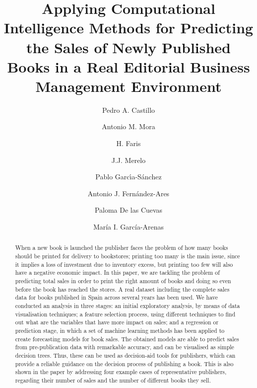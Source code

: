 \documentclass[a4paper,10pt,twocolumn,preprint,3p]{elsarticle}
\begin{document}
\begin{frontmatter}

\title{Applying Computational Intelligence Methods for Predicting the Sales of Newly Published Books in a Real Editorial Business Management Environment} 




\author[ugr]{Pedro A. Castillo}
\author[ugr]{Antonio M. Mora}
\author[abd]{H. Faris}
\author[ugr]{J.J. Merelo}
\author[ugr]{Pablo Garc\'{\i}a-S\'anchez}
\author[ugr]{Antonio J. Fern\'andez-Ares}
\author[ugr]{Paloma De las Cuevas}
\author[ugr]{Mar\'ia I. Garc\'ia-Arenas}


\address[ugr]{Department of Computer Architecture and Computer Technology, ETSIIT and CITIC \\
University of Granada, Granada, Spain. Tel: +34958241778. Fax: +34958248993}
\address[abd]{Business Information Technology Department, King Abdullah II School for Information Technology \\
The University of Jordan, Amman, Jordan}

\begin{abstract}
When a new book is launched the publisher faces the problem of how
many books should be printed for delivery to bookstores; printing too
many is the main issue, since it implies a loss of investment due to
inventory excess, but printing too few will also have a negative economic impact. 
In this paper, we are tackling the problem of predicting total sales 
in order to print the right amount of books and doing so even before the book 
has reached the stores. A real dataset including the complete sales data for 
books published in Spain across several years has been used.
We have conducted an analysis in three stages: an initial exploratory analysis, 
by means of data visualisation techniques; a feature selection process, using 
different techniques to find out what are the variables that have more impact on sales; 
and a regression or prediction stage, in which a set of machine learning methods 
has been applied to create forecasting models for book sales. 
The obtained models are able to predict sales from pre-publication data with
remarkable accuracy, and can be visualised as simple decision trees. 
Thus, these can be used as decision-aid tools for publishers, which can provide 
a reliable guidance on the decision process of publishing a book. 
This is also shown in the paper by addressing four example cases of representative 
publishers, regarding their number of sales and the number of different books they sell.
\end{abstract}


\end{frontmatter}
\end{document}
